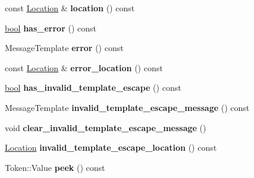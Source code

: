 \begin{DoxyCompactItemize}
const \mbox{\hyperlink{structv8_1_1internal_1_1Scanner_1_1Location}{Location}} \& {\bfseries location} () const
\item 
\mbox{\label{classv8_1_1internal_1_1Scanner_aa1f0e33b709700357e24cac17a6838ce}} 
\mbox{\hyperlink{classbool}{bool}} {\bfseries has\+\_\+error} () const
\item 
\mbox{\label{classv8_1_1internal_1_1Scanner_a0ccddf721d88d97ddded4e78ed9aa837}} 
Message\+Template {\bfseries error} () const
\item 
\mbox{\label{classv8_1_1internal_1_1Scanner_aef5266c62272244a809a6c0e11ad44c5}} 
const \mbox{\hyperlink{structv8_1_1internal_1_1Scanner_1_1Location}{Location}} \& {\bfseries error\+\_\+location} () const
\item 
\mbox{\label{classv8_1_1internal_1_1Scanner_a2efc5bf02d84f7c9b10cbb33074c2faf}} 
\mbox{\hyperlink{classbool}{bool}} {\bfseries has\+\_\+invalid\+\_\+template\+\_\+escape} () const
\item 
\mbox{\label{classv8_1_1internal_1_1Scanner_ad0a6499479568df560de92a4c8d87226}} 
Message\+Template {\bfseries invalid\+\_\+template\+\_\+escape\+\_\+message} () const
\item 
\mbox{\label{classv8_1_1internal_1_1Scanner_a1cf1fcaa537aefff5e2dad8be1191f44}} 
void {\bfseries clear\+\_\+invalid\+\_\+template\+\_\+escape\+\_\+message} ()
\item 
\mbox{\label{classv8_1_1internal_1_1Scanner_a24b159969b13804abc3840284fe6a00f}} 
\mbox{\hyperlink{structv8_1_1internal_1_1Scanner_1_1Location}{Location}} {\bfseries invalid\+\_\+template\+\_\+escape\+\_\+location} () const
\item 
\mbox{\label{classv8_1_1internal_1_1Scanner_a0ef30b387b3d68ad8d2c1c7d755eca95}} 
Token\+::\+Value {\bfseries peek} () const
\item 
\mbox{\label{classv8_1_1internal_1_1Scanner_a8bdc5f06d9bb99832a8c56927402161b}} 

\end{DoxyCompactItemize}
